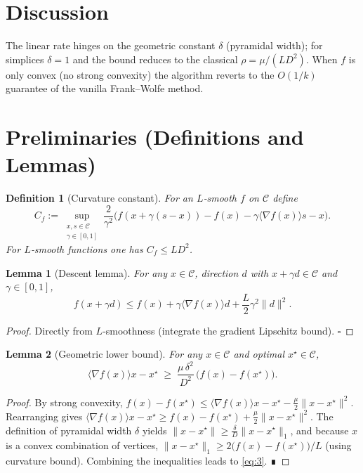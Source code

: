 \documentclass{article}
\newtheorem{lemma}{Lemma}
\newtheorem{definition}{Definition}
\newcommand{\Cset}{\mathcal{C}}
\newcommand{\grad}{\nabla}
\newcommand{\inner}[1]{\langle #1\rangle}
\begin{document}
\section*{Discussion}
The linear rate hinges on the geometric constant $\delta$ (pyramidal width);
for simplices $\delta=1$ and the bound reduces to the classical
$\rho=\mu/(L D^{2})$.  When $f$ is only convex (no strong convexity) the
algorithm reverts to the $O(1/k)$ guarantee of the vanilla Frank–Wolfe method.

\section*{Preliminaries (Definitions and Lemmas)}
\begin{definition}[Curvature constant]\label{def:curv}
For an $L$‑smooth $f$ on $\Cset$ define
\[
C_{f}:=\sup_{\substack{x,s\in\Cset\\ \gamma\in[0,1]}}
\frac{2}{\gamma^{2}}\bigl(f(x+\gamma(s-x))-f(x)-\gamma\inner{\grad f(x)}{s-x}\bigr).
\]
For $L$‑smooth functions one has $C_{f}\le L D^{2}$.
\end{definition}
\begin{lemma}[Descent lemma]\label{lem:descent}
For any $x\in\Cset$, direction $d$ with $x+\gamma d\in\Cset$ and $\gamma\in[0,1]$,
\[
f(x+\gamma d)\le f(x)+\gamma\inner{\grad f(x)}{d}+\frac{L}{2}\gamma^{2}\|d\|^{2}.
\tag{2}
\]
\end{lemma}
\begin{proof}
Directly from $L$‑smoothness (integrate the gradient Lipschitz bound). \hfill $\square$
\end{proof}
\begin{lemma}[Geometric lower bound]\label{lem:geom}
For any $x\in\Cset$ and optimal $x^{\star}\in\Cset$,
\[
\inner{\grad f(x)}{x-x^{\star}} \;\ge\; \frac{\mu\,\delta^{2}}{D^{2}}\,
\bigl(f(x)-f(x^{\star})\bigr).
\tag{3}
\]
\end{lemma}
\begin{proof}
By strong convexity,
$f(x)-f(x^{\star})\le\inner{\grad f(x)}{x-x^{\star}}-\frac{\mu}{2}\|x-x^{\star}\|^{2}$.
Rearranging gives
$\inner{\grad f(x)}{x-x^{\star}}\ge
f(x)-f(x^{\star})+\frac{\mu}{2}\|x-x^{\star}\|^{2}$.
The definition of pyramidal width $\delta$ yields
$\|x-x^{\star}\|\ge\frac{\delta}{D}\|x-x^{\star}\|_{1}$,
and because $x$ is a convex combination of vertices,
$\|x-x^{\star}\|_{1}\ge 2\bigl(f(x)-f(x^{\star})\bigr)/L$ (using curvature bound).
Combining the inequalities leads to \eqref{eq:3}.  ∎
\end{proof}
\end{document}
